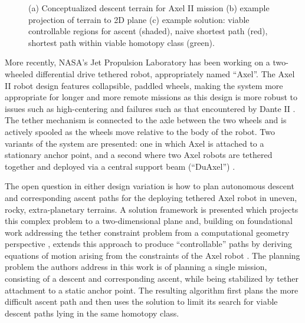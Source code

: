 \documentclass[12pt]{article}
\begin{document}
\begin{figure}
\begin{subfigure}{.2\textwidth}
    \caption{}
    \label{fig:planarpath}
  \end{subfigure}  %
  \label{fig:dsolution}
  \vspace{-0.1in}
  \caption{(a) Conceptualized descent terrain for Axel II mission (b) example projection of terrain to 2D plane
  (c) example solution: viable controllable regions for ascent (shaded), naive shortest path (red), shortest path within 
  viable homotopy class (green). }
\end{figure}

More recently, NASA's Jet Propulsion Laboratory has been working on a two-wheeled
differential drive tethered robot, appropriately named ``Axel''. The Axel II robot 
design features collapsible, paddled wheels, making the system more appropriate for longer 
and more remote missions as this design is more robust to issues such as high-centering and 
failures such as that encountered by Dante II \cite{axel_design}. The tether mechanism is connected to the axle 
between the two wheels and is actively spooled as the wheels move relative to the body of the robot. 
Two variants of the system are presented: one in which Axel is attached to a stationary anchor point, 
and a second where two Axel robots are tethered together and deployed via a central support beam (``DuAxel'') \cite{duaxel}. 

The open question in either design variation is how to plan autonomous descent and corresponding 
ascent paths for the deploying tethered Axel robot in uneven, rocky, extra-planetary terrains. 
A solution framework is presented which projects this complex problem to a two-dimensional plane and, 
building on foundational work addressing the tether constraint problem from a computational geometry 
perspective \cite{ties_that_bind, min_homotopies}, extends this approach to produce ``controllable'' 
paths by deriving equations of 
motion arising from the constraints of the Axel robot \cite{axel_planning}. 
The planning problem the authors address in this work is of planning a single mission, consisting of 
a descent and corresponding ascent, while being stabilized by tether attachment to a static anchor point. 
The resulting algorithm first plans the more difficult ascent path and then 
uses the solution to limit its search for viable descent paths lying in the same homotopy class. 
\end{document}

